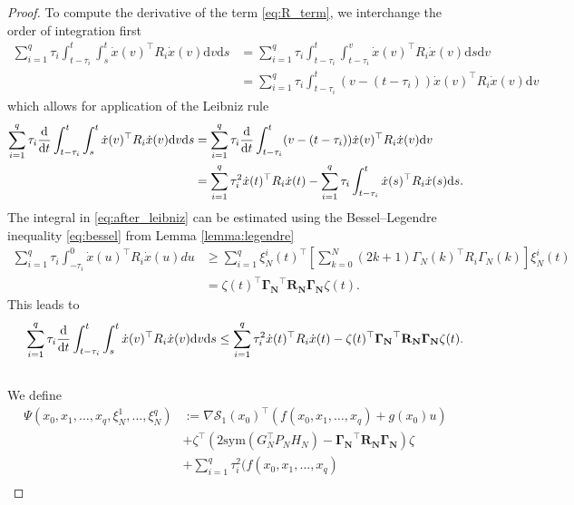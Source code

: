 \documentclass[12pt]{article}
\begin{document}
\begin{proof}
To compute the derivative of the term \eqref{eq:R_term}, we interchange the order of integration first 
\begin{align*}
\sum_{i=1}^q \tau_i \int_{t-\tau_i}^t\int_s^t\dot x(v)^\top R_i \dot x(v)\mathrm{d}v\mathrm{d}s&=\sum_{i=1}^q \tau_i \int_{t-\tau_i}^t\int_{t-\tau_i}^v\dot x(v)^\top R_i\dot x(v)\mathrm{d}s\mathrm{d}v\\&=\sum_{i=1}^q \tau_i \int_{t-\tau_i}^t(v-(t-\tau_i))\dot x(v)^\top R_i\dot x(v)\mathrm{d}v
\end{align*}
which allows for application of the Leibniz rule
{\footnotesize \begin{align}
\sum_{i=1}^q \tau_i\frac{\rm d}{{\rm d}t}\int_{t-\tau_i}^t\int_s^t\dot x(v)^\top R_i \dot x(v)\mathrm{d}v\mathrm{d}s&=\sum_{i=1}^q \tau_i \frac{\rm d}{{\rm d}t}\int_{t-\tau_i}^t(v-(t-\tau_i))\dot x(v)^\top R_i \dot x(v)\mathrm{d}v \nonumber \\
&=\footnotesize\sum_{i=1}^q \tau_i^2 \dot x(t)^\top R_i \dot x(t)-\sum_{i=1}^q \tau_i\int_{t-\tau_i}^t\dot x(s)^\top R_i \dot x(s)\mathrm{d}s. \label{eq:after_leibniz}
\end{align}}
The integral in \eqref{eq:after_leibniz} can be estimated using the Bessel--Legendre inequality \eqref{eq:bessel} from Lemma \ref{lemma:legendre}
\begin{align*}\nonumber
\sum_{i=1}^q \tau_i \int_{-\tau_i}^{0} \dot{x}(u)^\top R_i\dot{x}
(u)du &\geq \sum_{i=1}^q \xi_N^{i}(t)^\top\left[ 
\sum_{k=0}^{N} (2k+1) \Gamma_N(k)^\top R_i
\Gamma_N(k) \right] \xi^i_N(t)\\
&=\zeta(t)^\top \mathbf{\Gamma_N}^\top \mathbf{R_N}\mathbf{\Gamma_N}\zeta(t).
\end{align*}
This leads to 
{\footnotesize\begin{align}\nonumber
&~~~~   \sum_{i=1}^q \tau_i \frac{\rm d}{{\rm d}t}\int_{t-\tau_i}^t\int_s^t\dot x(v)^\top R_i\dot x(v)\mathrm{d}v\mathrm{d}s  \leq\sum_{i=1}^q \tau_i^2\dot{x}(t)^\top R_i \dot{x}(t)- \zeta(t)^\top\mathbf{\Gamma_N}^\top \mathbf{R_N}\mathbf{\Gamma_N}\zeta(t).\\
\nonumber
\end{align}}
We define 
\begin{align*}
\Psi(x_0,x_1,\ldots,x_q,\xi^1_N,\ldots,\xi^q_N)&:=\nabla\mathcal{S}_1(x_0)^\top(f(x_0,x_1,\ldots,x_q)+g(x_0)u)\\&+\zeta^\top(2\mathrm{sym}(G^\top_N P_N H_N)-\mathbf{\Gamma_N}^\top \mathbf{R_N}\mathbf{\Gamma_N})\zeta\\&+\sum_{i=1}^q \tau_i^2(f(x_0,x_1,\ldots,x_q)\\

\end{align*}
\end{proof}
\end{document}
